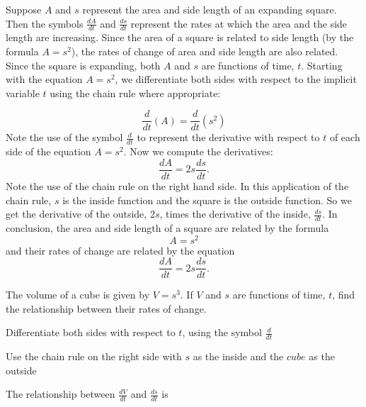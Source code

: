\documentclass{ximera}
\begin{document}
\begin{example} 
Suppose $A$ and $s$ represent the area and side length of an expanding square. 
Then the symbols $\frac{dA}{dt}$ and $\frac{ds}{dt}$ represent the rates at which 
the area and the side length are increasing. Since the area of a square is related 
to side length (by the formula $A = s^2$), the rates of change of area and side 
length are also related. Since the square is expanding, both $A$ and $s$ are 
functions of time, $t$.
Starting with the equation $A = s^2$, we differentiate both sides with respect 
to the implicit variable $t$ using the chain rule where appropriate:

\[\frac{d}{dt} (A) = \frac{d}{dt}(s^2) \]
Note the use of the symbol $\frac{d}{dt}$ to represent the derivative with 
respect to $t$ of each side of the equation $A = s^2$. Now we compute the derivatives:
\[\frac{dA}{dt}  = 2s\frac{ds}{dt}. \]
Note the use of the chain rule on the right hand side. In this application of the 
chain rule, $s$ is the inside function and the square is the outside function. 
So we get the derivative of the outside, $2s$, times the derivative of the inside, $\frac{ds}{dt}$.
In conclusion, the area and side length of a square are related by the formula
\[A = s^2\]
and their rates of change are related by the equation
\[\frac{dA}{dt} = 2s \frac{ds}{dt}.\]
\end{example}


\begin{question}
The volume of a cube is given by $V = s^3$. If $V$ and $s$ are functions of time, $t$, 
find the relationship between their rates of change.\\
\begin{hint}
Differentiate both sides with respect to $t$, using the symbol $\frac{d}{dt}$
\end{hint}
\begin{hint}
Use the chain rule on the right side with $s$ as the inside and the $cube$ as the outside
\end{hint}

The relationship between $\frac{dV}{dt}$ and $\frac{ds}{dt}$ is
\begin{multipleChoice}
\end{multipleChoice}
\end{question}
\end{document}
